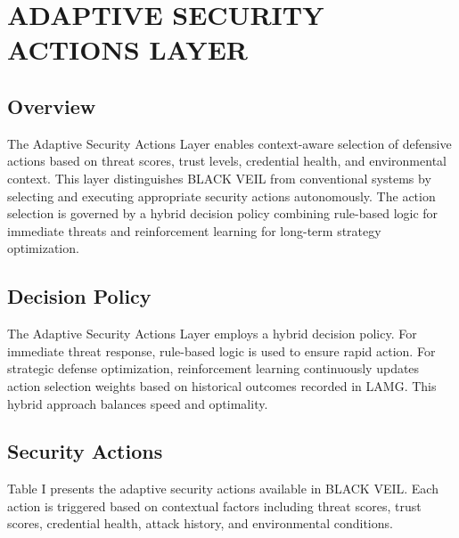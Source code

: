 \documentclass[12pt]{article}
\begin{document}
\newpage

\section{ADAPTIVE SECURITY ACTIONS LAYER}

\subsection{Overview}
The Adaptive Security Actions Layer enables context-aware selection of defensive actions based on threat scores, trust levels, credential health, and environmental context. This layer distinguishes BLACK VEIL from conventional systems by selecting and executing appropriate security actions autonomously. The action selection is governed by a hybrid decision policy combining rule-based logic for immediate threats and reinforcement learning for long-term strategy optimization.

\subsection{Decision Policy}
The Adaptive Security Actions Layer employs a hybrid decision policy. For immediate threat response, rule-based logic is used to ensure rapid action. For strategic defense optimization, reinforcement learning continuously updates action selection weights based on historical outcomes recorded in LAMG. This hybrid approach balances speed and optimality.

\subsection{Security Actions}
Table I presents the adaptive security actions available in BLACK VEIL. Each action is triggered based on contextual factors including threat scores, trust scores, credential health, attack history, and environmental conditions.
\end{document}
